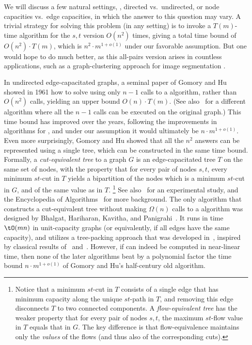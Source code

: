 We will discuss a few natural settings,
\eg, directed vs.\ undirected, or node capacities vs.\ edge capacities,
in which the answer to this question may vary.
A trivial strategy for solving this problem (in any setting)
is to invoke a $T(m)$-time algorithm for the $s,t$ version $O(n^2)$ times,
giving a total time bound of $O(n^2)\cdot T(m)$,
which is $n^2 \cdot m^{1+o(1)}$ under our favorable assumption.
But one would hope to do much better,
as this all-pairs version arises in countless applications,
such as a graph-clustering approach for image segmentation \cite{WL93}.


In undirected edge-capacitated graphs,
a seminal paper of Gomory and Hu~\cite{GH61} showed in 1961 how to solve \APMF
using only $n-1$ calls to a \MF algorithm, rather than $O(n^2)$ calls,
yielding an upper bound $O(n) \cdot T(m)$.
(See also~\cite{Gusfield90} for a different algorithm
where all the $n-1$ calls can be executed on the original graph.)
This time bound has improved over the years,
following the improvements in algorithms for \MF,
and under our assumption it would ultimately be $n\cdot m^{1+o(1)}$.
Even more surprisingly, Gomory and Hu showed that all the $n^2$ answers
can be represented using a single tree,
which can be constructed in the same time bound.
Formally,
%
a   %
\emph{cut-equivalent tree} to a graph $G$
is an edge-capacitated tree $T$ on the same set of nodes,
with the property that for every pair of nodes $s,t$,
every minimum $st$-cut in $T$ yields a bipartition of the nodes
which is a minimum $st$-cut in $G$, and of the same value as in $T$.%
\footnote{Notice that a minimum $st$-cut in $T$ consists of a
  single edge that has minimum capacity along the unique $st$-path in $T$,
  and removing this edge disconnects $T$ to two connected components.
  A \emph{flow-equivalent tree} has the weaker property that
  for every pair of nodes $s,t$,
  the maximum $st$-flow value in $T$ equals that in $G$.
  The key difference is that flow-equivalence maintains only the \emph{values}
  of the flows (and thus also of the corresponding cuts).
}
See also~\cite{GT01} for an experimental study,
and the Encyclopedia of Algorithms~\cite{Panigrahi16} for more background.
The only algorithm that constructs a cut-equivalent tree
without making $\Omega(n)$ calls to a \MF algorithm
was designed by Bhalgat, Hariharan, Kavitha, and Panigrahi~\cite{BHKP07}.
It runs in time %
${\tO}(mn)$    %
in unit-capacity graphs
(or equivalently, if all edges have the same capacity),
and utilizes a tree-packing approach that was developed in~\cite{Cole03,HKP07},
inspired by classical results of~\cite{Gabow95} and~\cite{Edmonds70}.
However, if \MF can indeed be computed in near-linear time,
then none of the later algorithms beat by a polynomial factor
the time bound $n\cdot m^{1+o(1)}$ of Gomory and Hu's half-century old algorithm.


